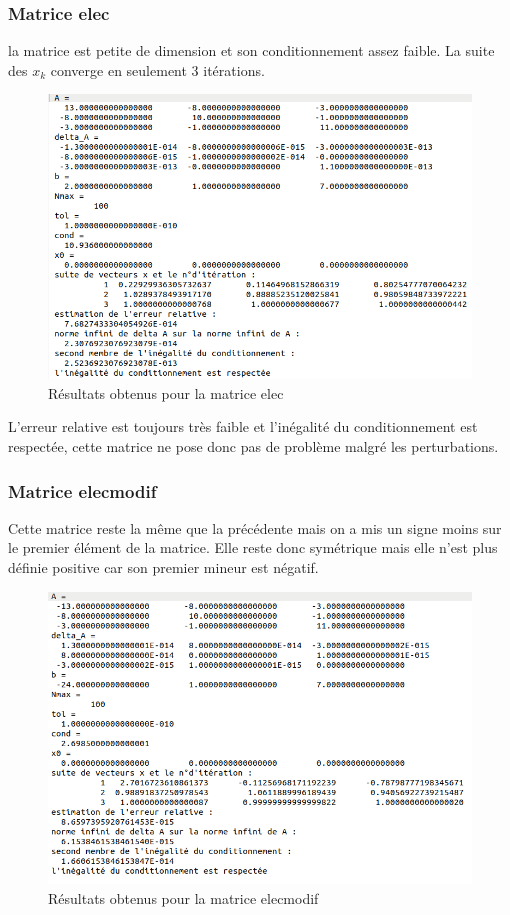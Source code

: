 \documentclass[12,french]{report}
\begin{document}
\subsubsection{Matrice elec}
la matrice est petite de dimension et son conditionnement assez faible. La suite des $x_{k}$ converge en seulement 3 itérations.

\begin{figure}[H]
	\centering
	\includegraphics[width=1\textwidth]{./Images/elec_1.res}
	\caption{Résultats obtenus pour la matrice elec}
\end{figure}

L'erreur relative est toujours très faible et l'inégalité du conditionnement est respectée, cette matrice ne pose donc pas de problème malgré les perturbations.

\subsubsection{Matrice elecmodif}

Cette matrice reste la même que la précédente mais on a mis un signe moins sur le premier élément de la matrice. Elle reste donc symétrique mais elle n'est plus définie positive car son premier mineur est négatif. 

\begin{figure}[H]
	\centering
	\includegraphics[width=1\textwidth]{./Images/elecmodif_1.res}
	\caption{Résultats obtenus pour la matrice elecmodif}
\end{figure}
\end{document}
